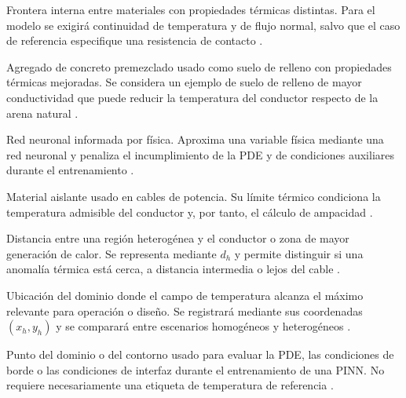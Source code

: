 \begin{description}[style=nextline,itemsep=0.5\baselineskip,parsep=0pt,topsep=0.25\baselineskip]
  \item[Interfaz térmica.] Frontera interna entre materiales con propiedades térmicas distintas. Para el modelo se exigirá continuidad de temperatura y de flujo normal, salvo que el caso de referencia especifique una resistencia de contacto \parencites{carslaw1959conduction,kakac2018heatConduction,hahn2012heatConduction}{patankar1980numerical}[3]{xing2023}[3--4,93--99]{cigre2025}.

  \item[Material PAC.] Agregado de concreto premezclado usado como suelo de relleno con propiedades térmicas mejoradas. Se considera un ejemplo de suelo de relleno de mayor conductividad que puede reducir la temperatura del conductor respecto de la arena natural \parencite[1,10,16]{kim2025}.

  \item[PINN.] Red neuronal informada por física. Aproxima una variable física mediante una red neuronal y penaliza el incumplimiento de la PDE y de condiciones auxiliares durante el entrenamiento \parencites[686--690]{raissi2019}[1--2,14--17]{lawal2022}[1,3,16]{pan2025}.

  \item[Polietileno reticulado o XLPE.] Material aislante usado en cables de potencia. Su límite térmico condiciona la temperatura admisible del conductor y, por tanto, el cálculo de ampacidad \parencites{iec60502_2_2014}[3--5]{enescu2020}[fig.~2]{kim2025}.

  \item[Proximidad de heterogeneidad.] Distancia entre una región heterogénea y el conductor o zona de mayor generación de calor. Se representa mediante $d_h$ y permite distinguir si una anomalía térmica está cerca, a distancia intermedia o lejos del cable \parencites[1,6--9]{khumalo2025}[1,10,16]{kim2025}[1--4]{oclon2015}.

  \item[Punto caliente.] Ubicación del dominio donde el campo de temperatura alcanza el máximo relevante para operación o diseño. Se registrará mediante sus coordenadas $(x_h,y_h)$ y se comparará entre escenarios homogéneos y heterogéneos \parencites[1,6--9]{khumalo2025}[1,10,16]{kim2025}.

  \item[Punto de colocación.] Punto del dominio o del contorno usado para evaluar la PDE, las condiciones de borde o las condiciones de interfaz durante el entrenamiento de una PINN. No requiere necesariamente una etiqueta de temperatura de referencia \parencites[686--690]{raissi2019}[1--2]{lawal2022}.


\end{description}
